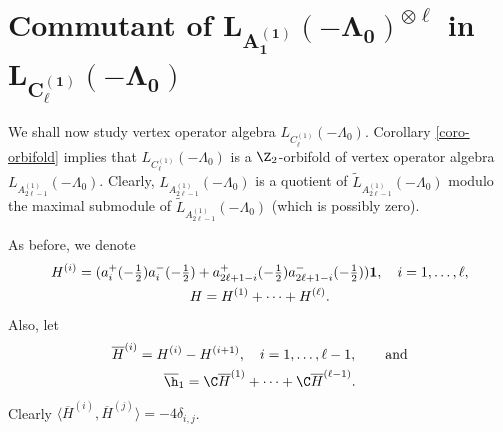\documentclass[pdftex]{sigma}
\begin{document}
\section[Commutant of $L _{A_1 ^{(1)}} (-\Lambda_0) ^{ \otimes \ell }$ in
$L_{C_{\ell} ^{(1)}} (-\Lambda_0)$]{Commutant of $\boldsymbol{L _{A_1 ^{(1)}} (-\Lambda_0) ^{ \otimes \ell }}$ in
$\boldsymbol{L_{C_{\ell} ^{(1)}} (-\Lambda_0)}$}

We shall now  study vertex operator algebra $L_{C_{\ell} ^{(1)}}
(-\Lambda_0) $. Corollary \ref{coro-orbifold} implies that
$L_{C_{\ell} ^{(1)}} (-\Lambda_0) $ is a ${\Z}_2$-orbifold of
vertex operator algebra $L_{A_{2 \ell -1} ^{(1)}} (-\Lambda_0)$.
Clearly, $L_{A_{2 \ell -1} ^{(1)}} (-\Lambda_0)$ is a quotient of
$\widetilde{L}_{A_{2 \ell -1} ^{(1)}} (-\Lambda_0)$ modulo the
maximal submodule of $\widetilde{L}_{A_{2 \ell -1} ^{(1)}}
(-\Lambda_0)$ (which is possibly zero).

As before, we denote
\begin{gather*}
H^{(i)}= (a_ i ^+ (-\tfrac{1}{2}) a_ i ^{-} (-\tfrac{1}{2})
+ a_{ 2\ell  +1- i}  ^+ (-\tfrac{1}{2}) a_{2\ell +1- i}  ^ - (-
\tfrac{1}{2}) ){\bf 1} , \quad i = 1, \dots, \ell,
\\
  H = H^{(1)} +  \cdots + H ^{ (\ell)}.
  \end{gather*}
Also, let
\begin{gather*}
 \overline{H}^{(i)} =  H ^{(i)} - H ^{(i+1)}, \quad i =1, \dots, \ell -1, \qquad \mbox{and} \nonumber \\
  \overline{\h}_1 = {\C} \overline{H}^{(1)} + \cdots +
{\C}\overline{H} ^{( \ell-1)}.
\end{gather*}
Clearly $\langle \overline{H} ^{(i)} , \overline{H} ^{(j)} \rangle
=-4 \delta_{i,j} $.
\end{document}
